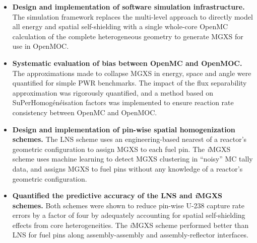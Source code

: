 \documentclass[12pt,twoside]{mitthesis-exec}
\begin{document}
\begin{itemize}

\item \textbf{Design and implementation of software simulation infrastructure.} The simulation framework replaces the multi-level approach to directly model all energy and spatial self-shielding with a single whole-core OpenMC calculation of the complete heterogeneous geometry to generate MGXS for use in OpenMOC.

\item \textbf{Systematic evaluation of bias between OpenMC and OpenMOC.} The approximations made to collapse MGXS in energy, space and angle were quantified for simple PWR benchmarks. The impact of the flux separability approximation was rigorously quantified, and a method based on SuPerHomog\'{e}n\'{e}isation factors was implemented to ensure reaction rate consistency between OpenMC and OpenMOC.

\item \textbf{Design and implementation of pin-wise spatial homogenization schemes.} The LNS scheme uses an engineering-based nearest of a reactor's geometric configuration to assign MGXS to each fuel pin. The \textit{i}MGXS scheme uses machine learning to detect MGXS clustering in ``noisy'' MC tally data, and assigns MGXS to fuel pins without any knowledge of a reactor's geometric configuration.




\item \textbf{Quantified the predictive accuracy of the LNS and \textit{i}MGXS schemes.} Both schemes were shown to reduce pin-wise U-238 capture rate errors by a factor of four by adequately accounting for spatial self-shielding effects from core heterogeneities. The \textit{i}MGXS scheme performed better than LNS for fuel pins along assembly-assembly and assembly-reflector interfaces. 



\end{itemize}
\end{document}
